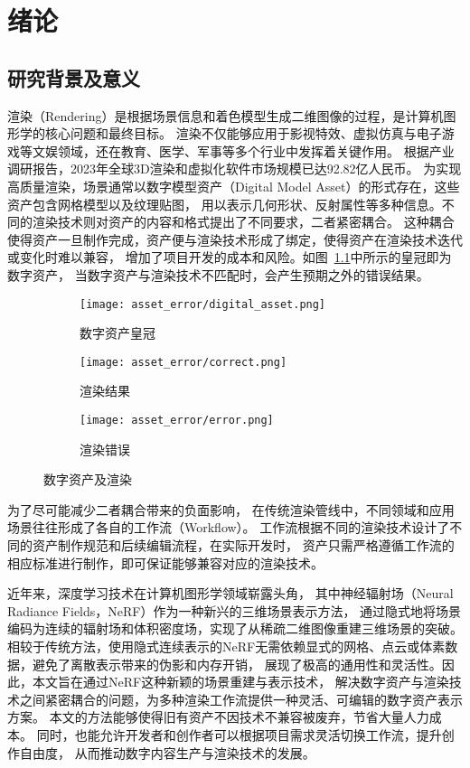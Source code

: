 
\chapter{绪论}
\section{研究背景及意义}
渲染（Rendering）是根据场景信息和着色模型生成二维图像的过程，是计算机图形学的核心问题和最终目标。
渲染不仅能够应用于影视特效、虚拟仿真与电子游戏等文娱领域，还在教育、医学、军事等多个行业中发挥着关键作用。
根据产业调研报告\cite{beizhesi2024}，2023年全球3D渲染和虚拟化软件市场规模已达92.82亿人民币。
为实现高质量渲染，场景通常以数字模型资产（Digital Model Asset）的形式存在，这些资产包含网格模型以及纹理贴图，
用以表示几何形状、反射属性等多种信息。不同的渲染技术则对资产的内容和格式提出了不同要求，二者紧密耦合。
这种耦合使得资产一旦制作完成，资产便与渲染技术形成了绑定，使得资产在渲染技术迭代或变化时难以兼容，
增加了项目开发的成本和风险。如图~\ref{fig:asset_rendering}中所示的皇冠即为数字资产，
当数字资产与渲染技术不匹配时，会产生预期之外的错误结果。
\begin{figure}[H]
  \centering
  \begin{subfigure}[t]{0.45\textwidth}
    \centering
    \texttt{[image: asset\_error/digital\_asset.png]}
    \caption{数字资产皇冠}
  \end{subfigure}
  \hspace{3mm}
  \begin{subfigure}[t]{0.225\textwidth}
    \centering
    \texttt{[image: asset\_error/correct.png]}
    \caption{渲染结果}
  \end{subfigure}
  \begin{subfigure}[t]{0.225\textwidth}
    \centering
    \texttt{[image: asset\_error/error.png]}
    \caption{渲染错误}
  \end{subfigure}
  \caption{数字资产及渲染}
  \label{fig:asset_rendering}
\end{figure}

为了尽可能减少二者耦合带来的负面影响，
在传统渲染管线中，不同领域和应用场景往往形成了各自的工作流（Workflow）。
工作流根据不同的渲染技术设计了不同的资产制作规范和后续编辑流程，在实际开发时，
资产只需严格遵循工作流的相应标准进行制作，即可保证能够兼容对应的渲染技术。

近年来，深度学习技术在计算机图形学领域崭露头角，
其中神经辐射场（Neural Radiance Fields，NeRF）作为一种新兴的三维场景表示方法，
通过隐式地将场景编码为连续的辐射场和体积密度场，实现了从稀疏二维图像重建三维场景的突破。
相较于传统方法，使用隐式连续表示的NeRF无需依赖显式的网格、点云或体素数据，避免了离散表示带来的伪影和内存开销，
展现了极高的通用性和灵活性。因此，本文旨在通过NeRF这种新颖的场景重建与表示技术，
解决数字资产与渲染技术之间紧密耦合的问题，为多种渲染工作流提供一种灵活、可编辑的数字资产表示方案。
本文的方法能够使得旧有资产不因技术不兼容被废弃，节省大量人力成本。
同时，也能允许开发者和创作者可以根据项目需求灵活切换工作流，提升创作自由度，
从而推动数字内容生产与渲染技术的发展。

